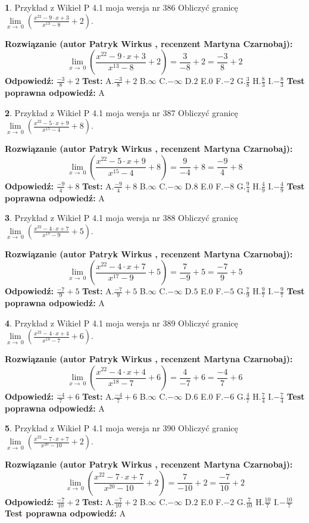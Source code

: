 \documentclass[12pt, a4paper]{article}
\theoremstyle{definition} %
\newtheorem{zad}{}
\newcommand{\zadStart}[1]{\begin{zad}#1\newline}
\newcommand{\zadStop}{\end{zad}}
\newcommand{\rozwStart}[2]{\noindent \textbf{Rozwiązanie (autor #1 , recenzent #2): }\newline}
\newcommand{\rozwStop}{\newline}
\newcommand{\odpStart}{\noindent \textbf{Odpowiedź:}\newline}
\newcommand{\odpStop}{\newline}
\newcommand{\testStart}{\noindent \textbf{Test:}\newline}
\newcommand{\testStop}{\newline}
\newcommand{\kluczStart}{\noindent \textbf{Test poprawna odpowiedź:}\newline}
\newcommand{\kluczStop}{\newline}
\begin{document}
\zadStart{Przykład z Wikieł P 4.1 moja wersja nr 386}
Obliczyć granicę $\lim\limits_{x\to\ 0}(\frac{x^{22}-9 \cdot x +3}{x^{13}-8}+2)$.
\zadStop
\rozwStart{Patryk Wirkus}{Martyna Czarnobaj}
$$\lim\limits_{x\to\ 0}(\frac{x^{22}-9 \cdot x +3}{x^{13}-8}+2)=\frac{3}{-8}+2=\frac{-3}{8}+2$$
\rozwStop
\odpStart
$\frac{-3}{8}+2$
\odpStop
\testStart
A.$\frac{-3}{8}+2$
B.$\infty$
C.$-\infty$
D.$2$
E.$0$
F.$-2$
G.$\frac{3}{8}$
H.$\frac{8}{3}$
I.$-\frac{8}{3}$
\testStop
\kluczStart
A
\kluczStop



\zadStart{Przykład z Wikieł P 4.1 moja wersja nr 387}
Obliczyć granicę $\lim\limits_{x\to\ 0}(\frac{x^{22}-5 \cdot x +9}{x^{15}-4}+8)$.
\zadStop
\rozwStart{Patryk Wirkus}{Martyna Czarnobaj}
$$\lim\limits_{x\to\ 0}(\frac{x^{22}-5 \cdot x +9}{x^{15}-4}+8)=\frac{9}{-4}+8=\frac{-9}{4}+8$$
\rozwStop
\odpStart
$\frac{-9}{4}+8$
\odpStop
\testStart
A.$\frac{-9}{4}+8$
B.$\infty$
C.$-\infty$
D.$8$
E.$0$
F.$-8$
G.$\frac{9}{4}$
H.$\frac{4}{9}$
I.$-\frac{4}{9}$
\testStop
\kluczStart
A
\kluczStop



\zadStart{Przykład z Wikieł P 4.1 moja wersja nr 388}
Obliczyć granicę $\lim\limits_{x\to\ 0}(\frac{x^{22}-4 \cdot x +7}{x^{17}-9}+5)$.
\zadStop
\rozwStart{Patryk Wirkus}{Martyna Czarnobaj}
$$\lim\limits_{x\to\ 0}(\frac{x^{22}-4 \cdot x +7}{x^{17}-9}+5)=\frac{7}{-9}+5=\frac{-7}{9}+5$$
\rozwStop
\odpStart
$\frac{-7}{9}+5$
\odpStop
\testStart
A.$\frac{-7}{9}+5$
B.$\infty$
C.$-\infty$
D.$5$
E.$0$
F.$-5$
G.$\frac{7}{9}$
H.$\frac{9}{7}$
I.$-\frac{9}{7}$
\testStop
\kluczStart
A
\kluczStop



\zadStart{Przykład z Wikieł P 4.1 moja wersja nr 389}
Obliczyć granicę $\lim\limits_{x\to\ 0}(\frac{x^{22}-4 \cdot x +4}{x^{18}-7}+6)$.
\zadStop
\rozwStart{Patryk Wirkus}{Martyna Czarnobaj}
$$\lim\limits_{x\to\ 0}(\frac{x^{22}-4 \cdot x +4}{x^{18}-7}+6)=\frac{4}{-7}+6=\frac{-4}{7}+6$$
\rozwStop
\odpStart
$\frac{-4}{7}+6$
\odpStop
\testStart
A.$\frac{-4}{7}+6$
B.$\infty$
C.$-\infty$
D.$6$
E.$0$
F.$-6$
G.$\frac{4}{7}$
H.$\frac{7}{4}$
I.$-\frac{7}{4}$
\testStop
\kluczStart
A
\kluczStop



\zadStart{Przykład z Wikieł P 4.1 moja wersja nr 390}
Obliczyć granicę $\lim\limits_{x\to\ 0}(\frac{x^{22}-7 \cdot x +7}{x^{20}-10}+2)$.
\zadStop
\rozwStart{Patryk Wirkus}{Martyna Czarnobaj}
$$\lim\limits_{x\to\ 0}(\frac{x^{22}-7 \cdot x +7}{x^{20}-10}+2)=\frac{7}{-10}+2=\frac{-7}{10}+2$$
\rozwStop
\odpStart
$\frac{-7}{10}+2$
\odpStop
\testStart
A.$\frac{-7}{10}+2$
B.$\infty$
C.$-\infty$
D.$2$
E.$0$
F.$-2$
G.$\frac{7}{10}$
H.$\frac{10}{7}$
I.$-\frac{10}{7}$
\testStop
\kluczStart
A
\kluczStop
\end{document}
